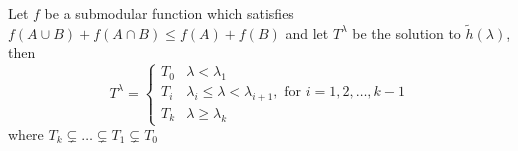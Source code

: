 \begin{proposition}\label{prop:struc}
Let $f$ be a submodular function which satisfies $f(A\cup B) + f(A\cap B) \leq f(A) + f(B)$ and 
let $T^{\lambda}$ be the solution to $\tilde{h}(\lambda)$, then 
\begin{equation}\label{eq:Alambda}
T^{\lambda}=\begin{cases}
T_0 & \lambda < \lambda_1 \\
T_i & \lambda_i \leq \lambda < \lambda_{i+1}, \textrm{ for } i=1, 2, \dots, k-1 \\
T_k & \lambda \geq \lambda_{k}
\end{cases}
\end{equation}
where $T_k \subsetneq  \dots \subsetneq T_1 \subsetneq T_0$
\end{proposition}